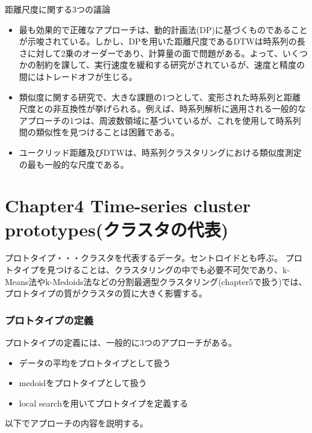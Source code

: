 \documentclass[dvipdfmx,11pt,notheorems]{beamer}
\theoremstyle{definition}
\begin{document}
\begin{frame}{距離尺度に関する3つの議論}
\begin{itemize}
\item 最も効果的で正確なアプローチは、動的計画法(DP)に基づくものであることが示唆されている。しかし、DPを用いた距離尺度であるDTWは時系列の長さに対して2乗のオーダーであり、計算量の面で問題がある。よって、いくつかの制約を課して、実行速度を緩和する研究がされているが、速度と精度の間にはトレードオフが生じる。
\item 類似度に関する研究で、大きな課題の1つとして、変形された時系列と距離尺度との非互換性が挙げられる。例えば、時系列解析に適用される一般的なアプローチの1つは、周波数領域に基づいているが、これを使用して時系列間の類似性を見つけることは困難である。
\item ユークリッド距離及びDTWは、時系列クラスタリングにおける類似度測定の最も一般的な尺度である。
\end{itemize}
\end{frame}


\section{Chapter4 Time-series cluster prototypes(クラスタの代表)}

\begin{frame}
プロトタイプ・・・クラスタを代表するデータ。セントロイドとも呼ぶ。\newline
\newline
プロトタイプを見つけることは、クラスタリングの中でも必要不可欠であり、k-Means法やk-Medoids法などの分割最適型クラスタリング(chapter5で扱う)では、プロトタイプの質がクラスタの質に大きく影響する。\\

\end{frame}

\begin{frame}\frametitle{プロトタイプの定義}
プロトタイプの定義には、一般的に3つのアプローチがある。
\begin{itemize}
\item データの平均をプロトタイプとして扱う\\
\item medoidをプロトタイプとして扱う
\item local searchを用いてプロトタイプを定義する
\end{itemize}
以下でアプローチの内容を説明する。
\end{frame}
\end{document}
